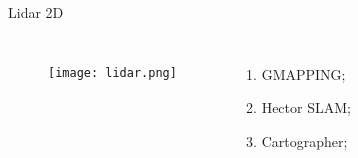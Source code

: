 {
%    
}
\begin{frame}[t]{Lidar 2D}
    \transboxout[duration=0.5]
    \begin{columns}
            \begin{figure}
            \texttt{[image: lidar.png]}
            \caption{\cite{Sensores71}}
            \end{figure}
            \begin{enumerate}
                \item GMAPPING;
                \item Hector SLAM;
                \item Cartographer;     
            \end{enumerate}
    \end{columns}
\end{frame}
